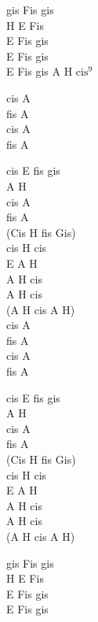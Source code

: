 \begin{chordw}
    gis Fis gis\\
    H E Fis\\
    E Fis gis\\
    E Fis gis\\
    E Fis gis A H $\mathrm{cis^9}$

    cis A\\
    fis A\\
    cis A\\
    fis A

    cis E fis gis\\
    A H\\
    cis A\\
    fis A\\
    (Cis H fis Gis)\\
    cis H cis\\
    E A H\\
    A H cis\\
    A H cis\\
    (A H cis A H)\\
    cis A\\
    fis A\\
    cis A\\
    fis A

    cis E fis gis\\
    A H\\
    cis A\\
    fis A\\
    (Cis H fis Gis)\\
    cis H cis\\
    E A H\\
    A H cis\\
    A H cis\\
    (A H cis A H)

    gis Fis gis\\
    H E Fis\\
    E Fis gis\\
    E Fis gis\\
\end{chordw}
